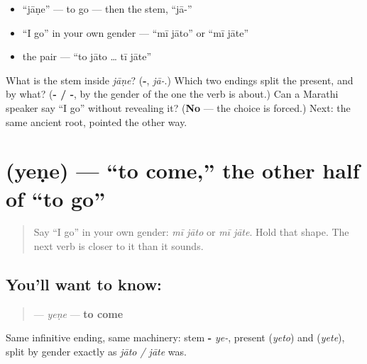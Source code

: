\begin{itemize}
\raggedright
  \item \textquotedblleft{}jāṇe\textquotedblright{} — to go — then the stem, \textquotedblleft{}jā-\textquotedblright{}
  \item \textquotedblleft{}I go\textquotedblright{} in your own gender — \textquotedblleft{}mī jāto\textquotedblright{} or \textquotedblleft{}mī jāte\textquotedblright{}
  \item the pair — \textquotedblleft{}to jāto … tī jāte\textquotedblright{}
\end{itemize}

\begin{tcolorbox}[breakable,colback=teal!4,colframe=teal!35!black,title={Before you move on}]
What is the stem inside \emph{jāṇe}? (\textbf{-}, \emph{jā-}.) Which two endings split the present, and by what? (\textbf{- / -}, by the gender of the one the verb is about.) Can a Marathi speaker say \textquotedblleft{}I go\textquotedblright{} without revealing it? (\textbf{No} — the choice is forced.) Next: the same ancient root, pointed the other way.
\end{tcolorbox}
\section[yeṇe]{ (yeṇe) — \textquotedblleft{}to come,\textquotedblright{} the other half of \textquotedblleft{}to go\textquotedblright{}}

\label{lesson:MR-C07-yene}



\begin{quote}
Say \textquotedblleft{}I go\textquotedblright{} in your own gender: \emph{mī jāto} or \emph{mī jāte}. Hold that shape. The next verb is closer to it than it sounds.
\end{quote}

\subsection*{You'll want to know: }
\begin{quote}
\textbf{} — \emph{yeṇe} — \textbf{to come}
\end{quote}

Same infinitive ending, same machinery: stem \textbf{-} \emph{ye-}, present \textbf{} (\emph{yeto}) and \textbf{} (\emph{yete}), split by gender exactly as \emph{jāto / jāte} was.

